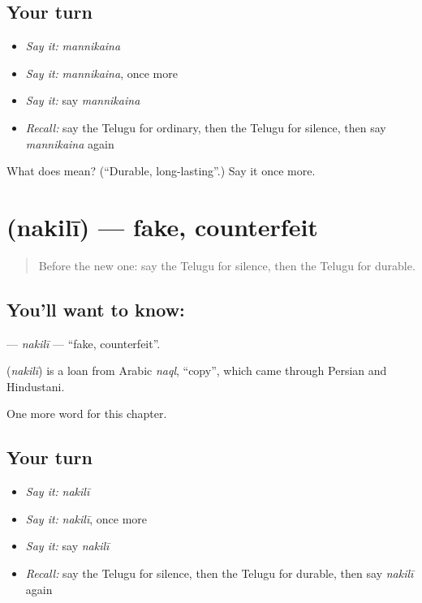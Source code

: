 \subsection*{Your turn}
\begin{itemize}
\raggedright
  \item \emph{Say it:} \emph{mannikaina}
  \item \emph{Say it:} \emph{mannikaina}, once more
  \item \emph{Say it:} say \emph{mannikaina}
  \item \emph{Recall:} say the Telugu for ordinary, then the Telugu for silence, then say \emph{mannikaina} again
\end{itemize}

\begin{tcolorbox}[breakable,colback=teal!4,colframe=teal!35!black,title={Before you move on}]
What does  mean? (\textquotedblleft{}Durable, long-lasting\textquotedblright{}.) Say it once more.
\end{tcolorbox}
\section[\texorpdfstring{\te{నకిలీ} (nakilī)}{నకిలీ (nakilī)}]{ (nakilī) — fake, counterfeit}

\label{lesson:TE-C182-nakili}



\begin{quote}
Before the new one: say the Telugu for silence, then the Telugu for durable.
\end{quote}

\subsection*{You'll want to know: }
\textbf{} — \emph{nakilī} — \textquotedblleft{}fake, counterfeit\textquotedblright{}.

\begin{cousinweb}
\textbf{} (\emph{nakilī}) is a loan from Arabic \emph{naql}, \textquotedblleft{}copy\textquotedblright{}, which came through Persian and Hindustani.
\end{cousinweb}

\begin{grammarlens}[title={What you've built}]
One more word for this chapter.
\end{grammarlens}

\subsection*{Your turn}
\begin{itemize}
\raggedright
  \item \emph{Say it:} \emph{nakilī}
  \item \emph{Say it:} \emph{nakilī}, once more
  \item \emph{Say it:} say \emph{nakilī}
  \item \emph{Recall:} say the Telugu for silence, then the Telugu for durable, then say \emph{nakilī} again
\end{itemize}

